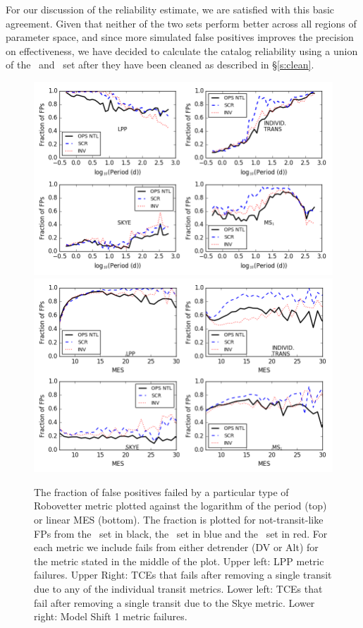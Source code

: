 For our discussion of the reliability estimate, we are satisfied with this basic agreement. Given that neither of the two sets perform better across all regions of parameter space, and since more simulated false positives improves the precision on effectiveness,  we have decided to calculate the catalog reliability using a union of the \scrtce\ and \invtce\ set after they have been cleaned as described in \S\ref{s:clean}.  



\begin{figure}[h!]
    \centering
    \includegraphics[width=0.9\linewidth]{fig-fractionFailsByMetric.png}
    \includegraphics[width=0.9\linewidth]{fig-fractionFailsByMetricMes.png}
    \caption{The fraction of false positives failed by a particular type of Robovetter metric plotted against the logarithm of the period (top) or linear MES (bottom).  The fraction is plotted for not-transit-like FPs from the \opstce\ set in black, the \scrtce\ set in blue and the \invtce\ set in red. For each metric we include fails from either detrender (DV or Alt) for the metric stated in the middle of the plot. Upper left: LPP metric failures. Upper Right: TCEs that fails after removing a single transit due to any of the individual transit metrics.  Lower left: TCEs that fail after removing a single transit due to the Skye metric. Lower right: Model Shift 1 metric failures. }
    \label{f:fractionFailMetric}
\end{figure}


